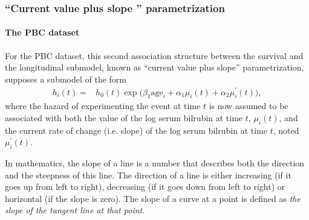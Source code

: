 \documentclass[12pt]{article}
\begin{document}
\subsubsection{``Current value plus slope '' parametrization}
\label{Current value plus slope}

\paragraph{The PBC dataset}
For the PBC dataset, this second association structure between the survival and the longitudinal submodel, known as ``current value plus slope'' parametrization, supposes a submodel of the form
\begin{equation}
\begin{split}
h_i(t) = &h_0 (t) \exp \big(\beta_1 \text{age}_i+ \alpha_1 \mu_i(t)+\alpha_2 \mu_i^{'}(t)\big),
\end{split}
\label{Survival model_p2}
\end{equation}
where the hazard of experimenting the event at time $t$ is now assumed to be associated with both the value of the log serum bilrubin at time $t$, $\mu_i(t)$, and the current rate of change (i.e. slope) of the log serum bilrubin at time $t$, noted $\mu_i^{'}(t)$. 

In mathematics, the slope of a line is a number that describes both the direction and the steepness of this line. The direction of a line is either increasing (if it goes up from left to right), decreasing (if it goes down from left to right) or horizontal (if the slope is zero). The slope of a curve at a point is defined as \textit{the slope of the tangent line at that point}. 
\end{document}
